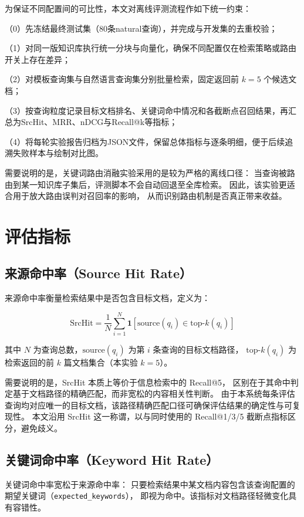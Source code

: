 为保证不同配置间的可比性，本文对离线评测流程作如下统一约束：

（0）先冻结最终测试集（80条natural查询），并完成与开发集的去重校验；

（1）对同一版知识库执行统一分块与向量化，确保不同配置仅在检索策略或路由开关上存在差异；

（2）对模板查询集与自然语言查询集分别批量检索，固定返回前 $k=5$ 个候选文档；

（3）按查询粒度记录目标文档排名、关键词命中情况和各截断点召回结果，再汇总为SrcHit、MRR、nDCG与Recall@k等指标；

（4）将每轮实验报告归档为JSON文件，保留总体指标与逐条明细，便于后续追溯失败样本与绘制对比图。

需要说明的是，关键词路由消融实验采用的是较为严格的离线口径：
当查询被路由到某一知识库子集后，评测脚本不会自动回退至全库检索。
因此，该实验更适合用于放大路由误判对召回率的影响，
从而识别路由机制是否真正带来收益。

\section{评估指标}

\subsection{来源命中率（Source Hit Rate）}

来源命中率衡量检索结果中是否包含目标文档，定义为：

\begin{equation}
    \text{SrcHit} = \frac{1}{N} \sum_{i=1}^{N} \mathbf{1}[\text{source}(q_i) \in \text{top-}k(q_i)]
\end{equation}

其中 $N$ 为查询总数，$\text{source}(q_i)$ 为第 $i$ 条查询的目标文档路径，
$\text{top-}k(q_i)$ 为检索返回的前 $k$ 篇文档集合（本实验 $k=5$）。

需要说明的是，SrcHit 本质上等价于信息检索中的 Recall@5，
区别在于其命中判定基于文档路径的精确匹配，而非宽松的内容相关性判断。
由于本系统每条评估查询均对应唯一的目标文档，该路径精确匹配口径可确保评估结果的确定性与可复现性。
本文沿用 SrcHit 这一称谓，以与同时使用的 Recall@1/3/5 截断点指标区分，避免歧义。

\subsection{关键词命中率（Keyword Hit Rate）}

关键词命中率宽松于来源命中率：
只要检索结果中某文档内容包含该查询配置的期望关键词（\texttt{expected\_keywords}），
即视为命中。该指标对文档路径轻微变化具有容错性。

